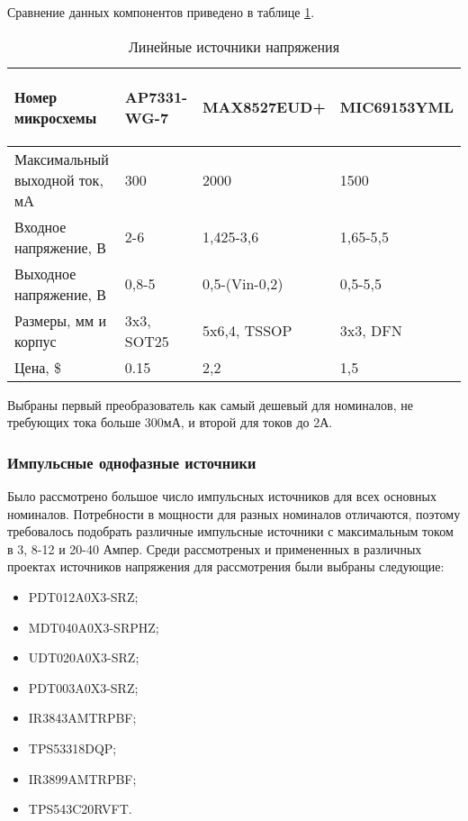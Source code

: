 Сравнение данных компонентов приведено в таблице \ref{linear-power}.
\begin{table}[H]
	\caption{Линейные источники напряжения}\label{linear-power}
	\begin{tabular}{|l|l|l|l|}
		\hline Номер микросхемы & 
		\begin{sideways} AP7331-WG-7 \end{sideways} & 
		\begin{sideways} MAX8527EUD+ \end{sideways} &
		\begin{sideways} MIC69153YML \end{sideways}   \\
		\hline Максимальный выходной ток, мА & 300 & 2000 & 1500 \\
		\hline Входное напряжение, В & 2-6 & 1,425-3,6 & 1,65-5,5 \\
		\hline Выходное напряжение, В & 0,8-5 & 0,5-(Vin-0,2) & 0,5-5,5 \\
		\hline Размеры, мм и корпус & 3x3, SOT25 & 5x6,4, TSSOP & 3x3, DFN  \\
		\hline Цена, \$ & 0.15 & 2,2 & 1,5 \\
		\hline 
	\end{tabular}
\end{table}

Выбраны первый преобразователь как самый дешевый для номиналов, не требующих тока больше 300мА, и второй для токов до 2А.

\subsubsection{Импульсные однофазные источники}

Было рассмотрено большое число импульсных источников для всех основных номиналов. Потребности в мощности для разных номиналов отличаются, поэтому требовалось подобрать различные импульсные источники с максимальным током в 3, 8-12 и 20-40 Ампер. Среди рассмотреных и примененных в различных проектах источников напряжения для рассмотрения были выбраны следующие:
 
\begin{itemize}
	\item PDT012A0X3-SRZ;
	\item MDT040A0X3-SRPHZ;
	\item UDT020A0X3-SRZ;
	\item PDT003A0X3-SRZ;
	\item IR3843AMTRPBF;
	\item TPS53318DQP;
	\item IR3899AMTRPBF;
	\item TPS543C20RVFT.
\end{itemize}

